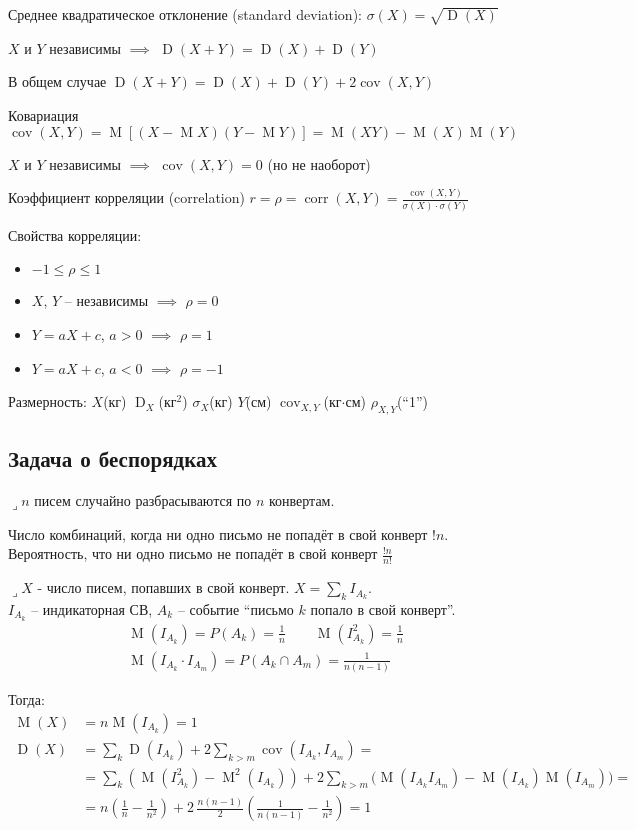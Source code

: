\documentclass[a4paper,12pt,fleqn]{article}
\newenvironment{onsamepage} {\begin{minipage}{\textwidth}} {\end{minipage}}
\numberwithin{figure}{section}
\theoremstyle{definition}
\let\leqs\leqslant
\DeclareMathOperator{\cov}{cov}
\DeclareMathOperator{\corr}{corr}
\DeclareMathOperator{\M}{M}
\DeclareMathOperator{\D}{D}
\def\lets{{\huge$\lrcorner$}\space}
\begin{document}
Среднее квадратическое отклонение (standard deviation):
$\sigma(X) = \sqrt{\D(X)}$

$X$ и $Y$ независимы $\implies$ $\D(X+Y) = \D(X) + \D(Y)$

В общем случае  $\D(X+Y) = \D(X) + \D(Y) + 2\cov(X,Y)$

Ковариация  $\cov(X,Y) = \M[(X-\M X)(Y-\M Y)] = \M(XY)-\M(X)\M(Y)$

$X$ и $Y$ независимы $\implies$ $\cov(X,Y)=0$ (но не наоборот)

Коэффициент корреляции (correlation)
$r = \rho = \corr(X,Y) = \frac{\cov(X,Y)}{\sigma(X) \cdot \sigma(Y)} $

Свойства корреляции:
\begin{itemize}
	\item $-1 \leqs \rho \leqs 1$
	\item $X$, $Y$ -- независимы $\implies$ $\rho=0$
	\item $Y=aX+c$, $a>0$ $\implies$ $\rho=1$
	\item $Y=aX+c$, $a<0$ $\implies$ $\rho=-1$
\end{itemize}

Размерность:
$X$(кг) $\D_X$(кг${}^2$) $\sigma_X$(кг)
$Y$(см) $\cov_{X,Y}$(кг$\cdot$см) $\rho_{X,Y}$(``1'')


\subsection{Задача о беспорядках}

\lets $n$ писем случайно разбрасываются по $n$ конвертам.

Число комбинаций, когда ни одно письмо не попадёт в свой конверт $!n$. \\
Вероятность, что ни одно письмо не попадёт в свой конверт $\frac{!n}{n!}$

\lets $X$ - число писем, попавших в свой конверт. $X = \sum_k I_{A_k}$. \\
$I_{A_k}$ -- индикаторная СВ,
$A_k$ -- событие ``письмо $k$ попало в свой конверт''.
\begin{align*}
&	\M(I_{A_k}) = P(A_k) = \frac{1}{n}	\qquad	\M(I_{A_k}^2) = \frac{1}{n} \\
&	\M(I_{A_k} \cdot I_{A_m}) = P(A_k \cap A_m) = \frac{1}{n(n-1)}
\end{align*}
\begin{onsamepage}
Тогда:
\begin{align*}
\M(X) &= n \M(I_{A_k}) = 1		\\
\D(X) &= \sum_k \D(I_{A_k}) + 2 \sum_{k>m} \cov(I_{A_k},I_{A_m}) = \\
	  &=   \sum_k \left( \M(I_{A_k}^2) - \M^2(I_{A_k}) \right)
	 	 +2\sum_{k>m} \big( \M(I_{A_k} I_{A_m}) - \M(I_{A_k}) \M(I_{A_m}) \big) = \\
	  &= n \left( \frac{1}{n} - \frac{1}{n^2} \right)
	     + 2\, \frac{n(n-1)}{2} \left( \frac{1}{n(n-1)} - \frac{1}{n^2} \right) = 1
\end{align*}
\end{onsamepage}
\end{document}
